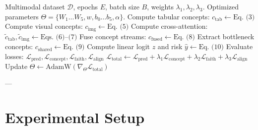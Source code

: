\documentclass[10pt,journal,compsoc,twocolumn]{IEEEtran}
\begin{document}
\begin{algorithm}[t]
\caption{End-to-End Training of XM-CBM}
\label{alg:training}
\begin{algorithmic}[1]
\REQUIRE Multimodal dataset $\mathcal{D}$, epochs $E$, batch size $B$, weights $\lambda_1, \lambda_2, \lambda_3$.
\ENSURE Optimized parameters $\Theta = \{W_1 \dots W_5, w, b_0 \dots b_5, \alpha\}$.
        \STATE Compute tabular concepts: $c_{\text{tab}} \gets \text{Eq.~(3)}$
        \STATE Compute visual concepts: $c_{\text{img}} \gets \text{Eq.~(5)}$
        \STATE Compute cross-attention: $\tilde{c}_{\text{tab}}, \tilde{c}_{\text{img}} \gets \text{Eqs.~(6)--(7)}$
        \STATE Fuse concept streams: $c_{\text{fused}} \gets \text{Eq.~(8)}$
        \STATE Extract bottleneck concepts: $c_{\text{shared}} \gets \text{Eq.~(9)}$
        \STATE Compute linear logit $z$ and risk $\hat{y} \gets \text{Eq.~(10)}$
        \STATE Evaluate losses: $\mathcal{L}_{\text{pred}}, \mathcal{L}_{\text{concept}}, \mathcal{L}_{\text{faith}}, \mathcal{L}_{\text{align}}$
        \STATE $\mathcal{L}_{\text{total}} \gets \mathcal{L}_{\text{pred}} + \lambda_1 \mathcal{L}_{\text{concept}} + \lambda_2 \mathcal{L}_{\text{faith}} + \lambda_3 \mathcal{L}_{\text{align}}$
        \STATE Update $\Theta \gets \text{AdamW}(\nabla_\Theta \mathcal{L}_{\text{total}})$
    \ENDFOR
\ENDFOR
\end{algorithmic}
\end{algorithm}

---

\section{Experimental Setup}
\end{document}
